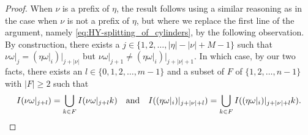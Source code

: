 \documentclass[10pt,a4paper]{amsart}
\begin{document}
\begin{proof}
When $\nu$ is a prefix of $\eta$, the result follows using a similar reasoning as in the case  when $\nu$ is not a prefix of $\eta$, but where we replace the first line of the argument, namely \eqref{eq:HY-splitting_of_cylinders}, by the following observation. By construction, there exists a $j \in \{ 1, 2, \ldots, \lvert \eta \rvert - \lvert \nu \rvert + M -1 \}$ such that $\nu \omega\vert_{j} = (\eta \omega\vert_{i})\vert_{j + \lvert \nu \rvert}$ but $\nu \omega\vert_{j+1} \neq (\eta \omega\vert_{i})\vert_{j + \lvert \nu \rvert + 1}$.  In which case, by our two facts, there exists an $l \in \{0, 1, 2, \ldots, m-1\}$ and a subset of $F$ of $\{1, 2, \ldots, n-1\}$ with $\lvert F \rvert \geq 2$ such that
    \[
        I(\nu \omega\vert_{j+l}) = \bigcup_{k \in F} 
        I(\nu \omega\vert_{j+l} k)
        \quad \text{and} \quad
        I((\eta \omega\vert_{i})\vert_{j + \lvert \nu \rvert + l}) = \bigcup_{k \in F} I((\eta \omega\vert_{i})\vert_{j + \lvert \nu \rvert +l} k).
        \qedhere
    \]
\end{proof}
\end{document}
